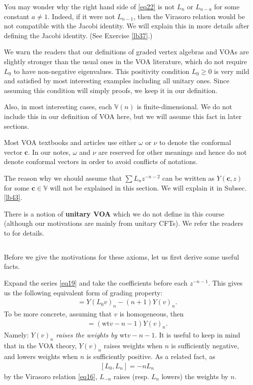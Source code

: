 \documentclass[12pt,a4paper,notitlepage]{article}
\theoremstyle{definition}
\theoremstyle{plain}
\newcommand{\Vbb}{\mathbb V}
\newcommand{\cbf}{\mathbf c}
\newcommand{\wt}{\mathrm{wt}}
\numberwithin{equation}{section}
\begin{document}
You may wonder why the right hand side of \eqref{eq22} is not $L_n$ or $L_{n-a}$ for some constant $a\neq 1$. Indeed, if it were not $L_{n-1}$, then the Virasoro relation would be not compatible with the Jacobi identity. We will explain this in more details after defining the Jacobi identity. (See Exercise \ref{lb37}.)



We warn the readers that our definitions of graded vertex algebras and VOAs are slightly stronger than the usual ones in the VOA literature, which do not require  $L_0$ to have non-negative eigenvalues. This positivity condition $L_0\geq 0$ is very mild and satisfied by most interesting examples including all unitary ones. Since assuming this condition will simply proofs, we keep it in our definition.

Also, in most interesting cases, each $\Vbb(n)$ is finite-dimensional. We do not include this in our definition of VOA here, but we will assume this fact in later sections.

Most VOA textbooks and articles use either $\omega$ or $\nu$ to denote the conformal vector $\cbf$. In our notes, $\omega$ and $\nu$ are reserved for other meanings and hence do not denote conformal vectors in order to avoid conflicts of notations. 

The reason why we should assume that $\sum L_nz^{-n-2}$ can be written as $Y(\cbf,z)$ for some $\cbf\in\Vbb$ will not be explained in this section. We will explain it in Subsec. \ref{lb43}.

There is a notion of \textbf{unitary VOA} which we do not define in this course (although our motivations are mainly from unitary CFTs). We refer the readers to \cite{CKLW18,DL14} for details.


\subsection{}

Before we give the motivations for these axioms, let us first derive some useful facts.

Expand the series \eqref{eq19} and take the coefficients before each $z^{-n-1}$. This gives us  the following equivalent form of grading property:
\begin{align}
[L_0,Y(v)_n]=Y(L_0v)_n-(n+1)Y(v)_n.	\label{eq20}
\end{align}
To be more concrete, assuming that $v$ is homogeneous, then
\begin{align}
[L_0,Y(v)_n]=(\wt v-n-1)Y(v)_n.	\label{eq21}
\end{align}
Namely: \emph{$Y(v)_n$ raises the weights by $\wt v-n-1$}. It is useful to keep in mind that in the VOA theory, $Y(v)_n$ raises weights when $n$ is sufficiently negative, and lowers weights when $n$ is sufficiently positive. As a related fact, as
\begin{align}\label{eq57}
[L_0,L_n]=-nL_n	
\end{align}
by the Virasoro relation \eqref{eq16}, $L_{-n}$ raises (resp. $L_n$ lowers) the weights by $n$. 
\end{document}
